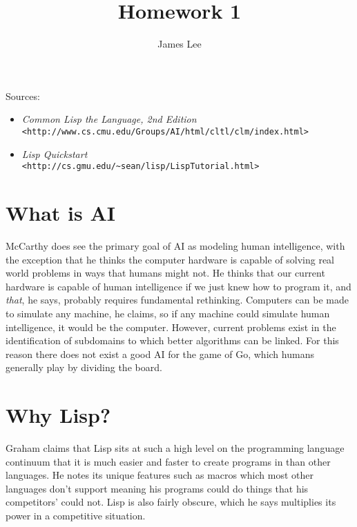 \documentclass{article}
\title{Homework 1}
\author{James Lee}
\begin{document}
\maketitle

\noindent Sources:
\begin{itemize}
\item \emph{Common Lisp the Language, 2nd Edition}\\
\verb+<http://www.cs.cmu.edu/Groups/AI/html/cltl/clm/index.html>+

\item \emph{Lisp Quickstart}\\
\verb+<http://cs.gmu.edu/~sean/lisp/LispTutorial.html>+
\end{itemize}

\section{What is AI}
McCarthy does see the primary goal of AI as modeling human intelligence, with the exception that he thinks the computer hardware is capable of solving real world problems in ways that humans might not.  He thinks that our current hardware is capable of human intelligence if we just knew how to program it, and \emph{that}, he says, probably requires fundamental rethinking.  Computers can be made to simulate any machine, he claims, so if any machine could simulate human intelligence, it would be the computer.  However, current problems exist in the identification of subdomains to which better algorithms can be linked.  For this reason there does not exist a good AI for the game of Go, which humans generally play by dividing the board.

\section{Why Lisp?}
Graham claims that Lisp sits at such a high level on the programming language continuum that it is much easier and faster to create programs in than other languages.  He notes its unique features such as macros which most other languages don't support meaning his programs could do things that his competitors' could not.  Lisp is also fairly obscure, which he says multiplies its power in a competitive situation.
\end{document}
